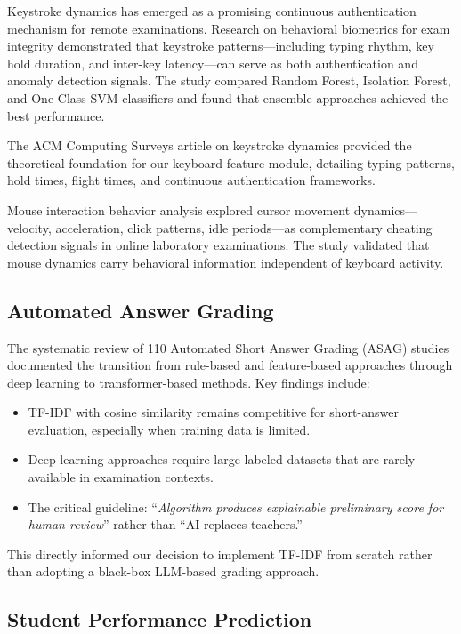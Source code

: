 \documentclass{article}
\begin{document}
Keystroke dynamics has emerged as a promising continuous authentication mechanism for remote examinations. Research on behavioral biometrics for exam integrity \cite{keystroke_biometrics_2025} demonstrated that keystroke patterns---including typing rhythm, key hold duration, and inter-key latency---can serve as both authentication and anomaly detection signals. The study compared Random Forest, Isolation Forest, and One-Class SVM classifiers and found that ensemble approaches achieved the best performance.

The ACM Computing Surveys article on keystroke dynamics \cite{keystroke_survey_2025} provided the theoretical foundation for our keyboard feature module, detailing typing patterns, hold times, flight times, and continuous authentication frameworks.

Mouse interaction behavior analysis \cite{mouse_dynamics_2023} explored cursor movement dynamics---velocity, acceleration, click patterns, idle periods---as complementary cheating detection signals in online laboratory examinations. The study validated that mouse dynamics carry behavioral information independent of keyboard activity.

\subsection{Automated Answer Grading}

The systematic review of 110 Automated Short Answer Grading (ASAG) studies \cite{asag_review_2025} documented the transition from rule-based and feature-based approaches through deep learning to transformer-based methods. Key findings include:

\begin{itemize}
    \item TF-IDF with cosine similarity remains competitive for short-answer evaluation, especially when training data is limited.
    \item Deep learning approaches require large labeled datasets that are rarely available in examination contexts.
    \item The critical guideline: ``\textit{Algorithm produces explainable preliminary score for human review}'' rather than ``AI replaces teachers.''
\end{itemize}

This directly informed our decision to implement TF-IDF from scratch rather than adopting a black-box LLM-based grading approach.

\subsection{Student Performance Prediction}
\end{document}
